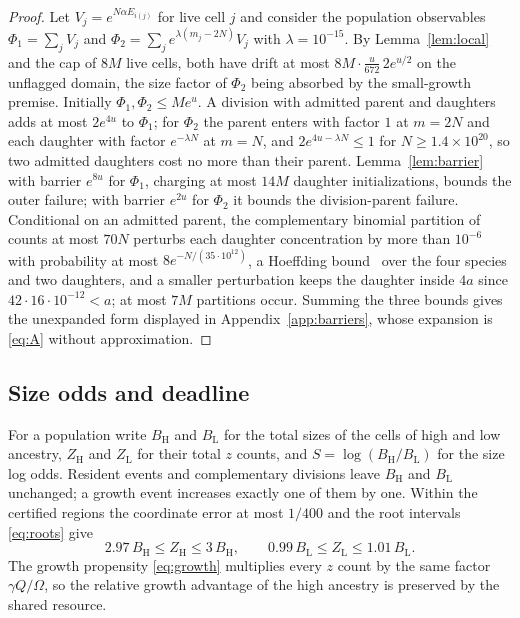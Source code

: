 \documentclass[11pt,a4paper]{article}
\theoremstyle{plain}
\theoremstyle{definition}
\theoremstyle{remark}
\newcommand{\lo}{\mathrm L}
\newcommand{\hi}{\mathrm H}
\begin{document}
\begin{proof}
Let $V_j=e^{N\alpha E_{i(j)}}$ for live cell $j$ and consider the population observables $\Phi_1=\sum_jV_j$ and $\Phi_2=\sum_je^{\lambda(m_j-2N)}V_j$ with $\lambda=10^{-15}$. By Lemma~\ref{lem:local} and the cap of $8M$ live cells, both have drift at most $8M\cdot\frac u{672}\,2e^{u/2}$ on the unflagged domain, the size factor of $\Phi_2$ being absorbed by the small-growth premise. Initially $\Phi_1,\Phi_2\le Me^u$. A division with admitted parent and daughters adds at most $2e^{4u}$ to $\Phi_1$; for $\Phi_2$ the parent enters with factor $1$ at $m=2N$ and each daughter with factor $e^{-\lambda N}$ at $m=N$, and $2e^{4u-\lambda N}\le1$ for $N\ge1.4\times10^{20}$, so two admitted daughters cost no more than their parent. Lemma~\ref{lem:barrier} with barrier $e^{8u}$ for $\Phi_1$, charging at most $14M$ daughter initializations, bounds the outer failure; with barrier $e^{2u}$ for $\Phi_2$ it bounds the division-parent failure. Conditional on an admitted parent, the complementary binomial partition of counts at most $70N$ perturbs each daughter concentration by more than $10^{-6}$ with probability at most $8e^{-N/(35\cdot10^{12})}$, a Hoeffding bound~\citep{hoeffding1963} over the four species and two daughters, and a smaller perturbation keeps the daughter inside $4a$ since $42\cdot16\cdot10^{-12}<a$; at most $7M$ partitions occur. Summing the three bounds gives the unexpanded form displayed in Appendix~\ref{app:barriers}, whose expansion is \eqref{eq:A} without approximation.
\end{proof}

\subsection{Size odds and deadline}
For a population write $B_\hi$ and $B_\lo$ for the total sizes of the cells of high and low ancestry, $Z_\hi$ and $Z_\lo$ for their total $z$ counts, and $S=\log(B_\hi/B_\lo)$ for the size log odds. Resident events and complementary divisions leave $B_\hi$ and $B_\lo$ unchanged; a growth event increases exactly one of them by one. Within the certified regions the coordinate error at most $1/400$ and the root intervals \eqref{eq:roots} give
\begin{equation}\label{eq:sandwich}
2.97\,B_\hi\le Z_\hi\le3\,B_\hi,\qquad 0.99\,B_\lo\le Z_\lo\le1.01\,B_\lo .
\end{equation}
The growth propensity \eqref{eq:growth} multiplies every $z$ count by the same factor $\gamma Q/\Omega$, so the relative growth advantage of the high ancestry is preserved by the shared resource.
\end{document}
